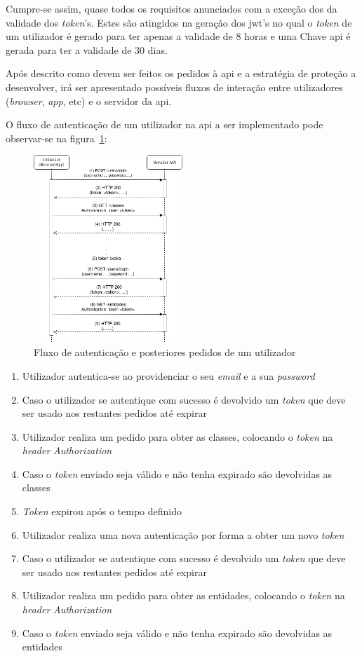 Cumpre-se assim, quase todos os requisitos anunciados com a exceção dos da validade dos \textit{token}'s. Estes são atingidos na geração dos \acrshort{jwt}'s no qual o \textit{token} de um utilizador é gerado para ter apenas a validade de 8 horas e uma Chave \acrshort{api} é gerada para ter a validade de 30 dias.

Após descrito como devem ser feitos os pedidos à \acrshort{api} e a estratégia de proteção a desenvolver, irá ser apresentado possíveis fluxos de interação entre utilizadores (\textit{browser}, \textit{app}, etc) e o servidor da \acrshort{api}.

O fluxo de autenticação de um utilizador na \acrshort{api} a ser implementado pode observar-se na figura~\ref{fig:userAuth}:
\begin{figure}[H]
    \centering
    \includegraphics[width=0.5\textwidth]{img/userAuth.png}
    \caption{Fluxo de autenticação e posteriores pedidos de um utilizador}\label{fig:userAuth}
\end{figure}

\begin{enumerate}
    \item Utilizador autentica-se ao providenciar o seu \textit{email} e a sua \textit{password}
    \item Caso o utilizador se autentique com sucesso é devolvido um \textit{token} que deve ser usado nos restantes pedidos até expirar
    \item Utilizador realiza um pedido para obter as classes, colocando o \textit{token} na \textit{header} \textit{Authorization}
    \item Caso o \textit{token} enviado seja válido e não tenha expirado são devolvidas as classes
    \item \textit{Token} expirou após o tempo definido
    \item Utilizador realiza uma nova autenticação por forma a obter um novo \textit{token}
    \item Caso o utilizador se autentique com sucesso é devolvido um \textit{token} que deve ser usado nos restantes pedidos até expirar
    \item Utilizador realiza um pedido para obter as entidades, colocando o \textit{token} na \textit{header} \textit{Authorization}
    \item Caso o \textit{token} enviado seja válido e não tenha expirado são devolvidas as entidades
\end{enumerate}

